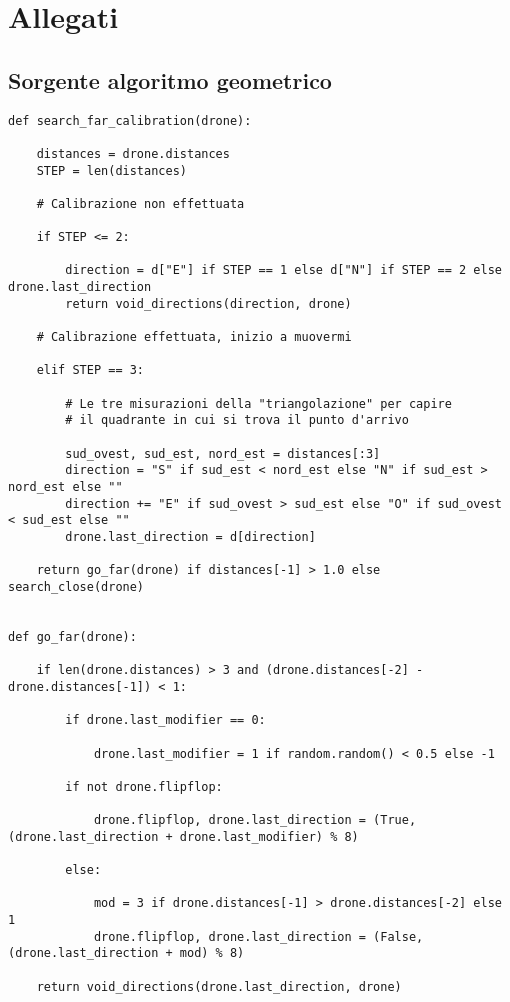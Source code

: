 \chapter{Allegati}
\section{Sorgente algoritmo geometrico}
\begin{verbatim}
def search_far_calibration(drone):

    distances = drone.distances
    STEP = len(distances)

    # Calibrazione non effettuata

    if STEP <= 2:

        direction = d["E"] if STEP == 1 else d["N"] if STEP == 2 else drone.last_direction
        return void_directions(direction, drone)

    # Calibrazione effettuata, inizio a muovermi

    elif STEP == 3:

        # Le tre misurazioni della "triangolazione" per capire
        # il quadrante in cui si trova il punto d'arrivo

        sud_ovest, sud_est, nord_est = distances[:3]
        direction = "S" if sud_est < nord_est else "N" if sud_est > nord_est else ""
        direction += "E" if sud_ovest > sud_est else "O" if sud_ovest < sud_est else ""
        drone.last_direction = d[direction]

    return go_far(drone) if distances[-1] > 1.0 else search_close(drone)


def go_far(drone):

    if len(drone.distances) > 3 and (drone.distances[-2] - drone.distances[-1]) < 1:

        if drone.last_modifier == 0:

            drone.last_modifier = 1 if random.random() < 0.5 else -1

        if not drone.flipflop:

            drone.flipflop, drone.last_direction = (True, (drone.last_direction + drone.last_modifier) % 8)

        else:

            mod = 3 if drone.distances[-1] > drone.distances[-2] else 1
            drone.flipflop, drone.last_direction = (False, (drone.last_direction + mod) % 8)

    return void_directions(drone.last_direction, drone)



\end{verbatim}
